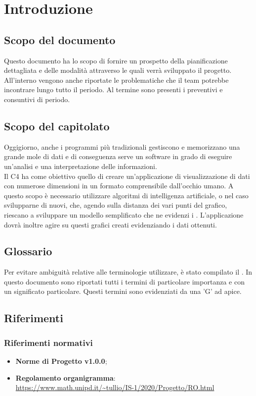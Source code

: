 \section{Introduzione}

\subsection{Scopo del documento}
Questo documento ha lo scopo di fornire un prospetto della pianificazione dettagliata e delle modalità attraverso le quali verrà sviluppato il progetto. All'interno vengono anche riportate le problematiche che il team potrebbe incontrare lungo tutto il periodo. Al termine sono presenti i preventivi e consuntivi di periodo.

\subsection{Scopo del capitolato}
Oggigiorno, anche i programmi più tradizionali gestiscono e memorizzano una grande mole di dati e di conseguenza serve un software in grado di eseguire un'analisi e una interpretazione delle informazioni.\\
Il  C4 ha come obiettivo quello di creare un'applicazione di visualizzazione di dati con numerose dimensioni in un formato comprensibile dall'occhio umano.  A questo scopo è necessario utilizzare algoritmi di intelligenza artificiale, o nel caso svilupparne di nuovi, che, agendo sulla distanza dei vari punti del grafico, riescano a sviluppare un modello semplificato che ne evidenzi i . 
L'applicazione dovrà inoltre agire su questi grafici creati evidenziando i dati ottenuti.

\subsection{Glossario}
Per evitare ambiguità relative alle terminologie utilizzare, è stato compilato il . In questo documento sono riportati tutti i termini di particolare importanza e con un significato particolare. Questi termini sono evidenziati da una 'G' ad apice.

\subsection{Riferimenti}
\subsubsection{Riferimenti normativi}
\begin{itemize}	
	\item \textbf{Norme di Progetto v1.0.0};
	
	\item \textbf{Regolamento organigramma}:\\
	\textcolor{blue}{\url{https://www.math.unipd.it/~tullio/IS-1/2020/Progetto/RO.html}}
\end{itemize}

